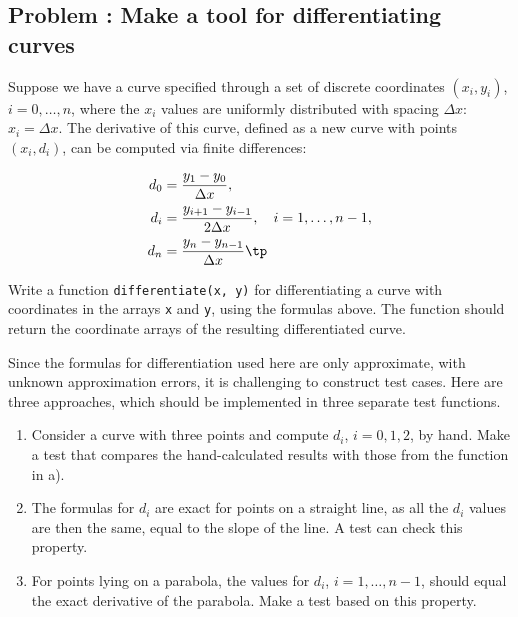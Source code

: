 \documentclass[graybox,sectrefs,envcountresetchap,open=right,final]{svmonodo}
\newenvironment{doconceexercise}{}{}
\newcounter{doconceexercisecounter}
\begin{document}
\begin{doconceexercise}

\subsection*{Problem \thedoconceexercisecounter: Make a tool for differentiating curves}

\label{softeng1:exer:derivative}

Suppose we have a curve specified through a set
of discrete coordinates $(x_i,y_i)$, $i=0,\ldots,n$, where the $x_i$
values are uniformly distributed with spacing $\Delta x$: $x_i=\Delta x$.
The derivative of this curve, defined as a new curve with points
$(x_i, d_i)$, can be computed via finite differences:

\begin{align}
d_0 &= \frac{y_1-y_0}{\Delta x},\\ 
d_i &= \frac{y_{i+1}-y_{i-1}}{2\Delta x},\quad i=1,\ldots,n-1,\\ 
d_n &= \frac{y_n-y_{n-1}}{\Delta x}\tp
\end{align}


Write a function
\texttt{differentiate(x, y)} for differentiating a curve
with coordinates in the arrays \texttt{x} and \texttt{y}, using the
formulas above. The function should return the coordinate arrays
of the resulting differentiated curve.

Since the formulas for differentiation used here are only approximate,
with unknown approximation errors, it is challenging to construct
test cases. Here are three approaches, which should be implemented
in three separate test functions.

\begin{enumerate}
\item Consider a curve with three points and compute $d_i$, $i=0,1,2$,
   by hand. Make a test that compares the hand-calculated results with those
   from the function in a).

\item The formulas for $d_i$ are exact for points on
   a straight line, as all the $d_i$ values are then the same, equal to
   the slope of the line. A test can check this property.

\item For points lying on a parabola, the values for $d_i$, $i=1,\ldots,n-1$,
   should equal the exact derivative of the parabola. Make a test based on
   this property.
\end{enumerate}


\end{doconceexercise}
\end{document}
